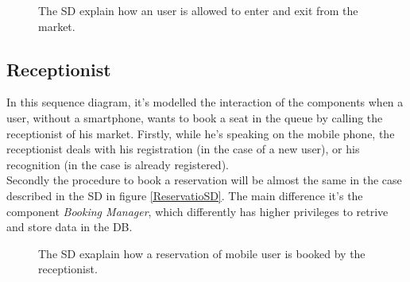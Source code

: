 \begin{figure}[H]
  \label{EntryExitSD}
  \centering
    \caption{The SD explain how an user is allowed to enter and exit from the market.}
\end{figure} 

\pagebreak

\subsection{Receptionist}
In this sequence diagram, it's modelled the interaction of the components when a user, without a smartphone, wants to book a seat in the queue by calling the receptionist of his market. Firstly, while he's speaking on the mobile phone, the receptionist deals with his registration (in the case of a new user), or his recognition (in the case is already registered).\\
Secondly the procedure to book a reservation will be almost the same in the case described in the SD in figure \ref{ReservatioSD}. The main difference it's the component \textit{Booking Manager}, which differently has higher privileges to retrive and store data in the DB.

\begin{figure}[H]
  \label{MobileUserSD}
  \centering
    \caption{The SD exaplain how a reservation of mobile user is booked by the receptionist.}
\end{figure} 

